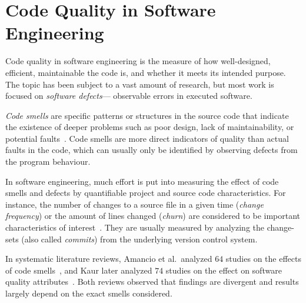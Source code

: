 \section{Code Quality in Software Engineering}\label{sec:background}
Code quality in software engineering is the measure of how well-designed, efficient, maintainable the code is,
and whether it meets its intended purpose.
The topic has been subject to a vast amount of research,
but most work is focused on \emph{software defects}---%
observable errors in executed software.

\emph{Code smells} are specific patterns or structures in the source code that indicate the existence of deeper problems such as poor design, lack of maintainability, or potential faults~\cite[Ch.~3]{beck1999bad}.
Code smells are more direct indicators of quality than actual faults in the code,
which can usually only be identified by observing defects from the program behaviour.

In software engineering,
much effort is put into measuring the effect of code smells and defects
by quantifiable project and source code characteristics.
For instance,
the number of changes to a source file in a given time (\emph{change frequency})
or the amount of lines changed (\emph{churn})
are considered to be important characteristics of interest~\cite{Smells2009Khomh}.
They are usually measured by analyzing the change-sets (also called \emph{commits}) from the underlying version control system.

In systematic literature reviews,
Amancio et al.\ analyzed $64$ studies on the effects of code smells~\cite{SmellEeffectReview2018Santos},
and Kaur later analyzed $74$ studies on the effect on software quality attributes~\cite{SmellQualityReview2019Kaur}.
Both reviews observed that findings are divergent and results largely depend on the exact smells considered.

